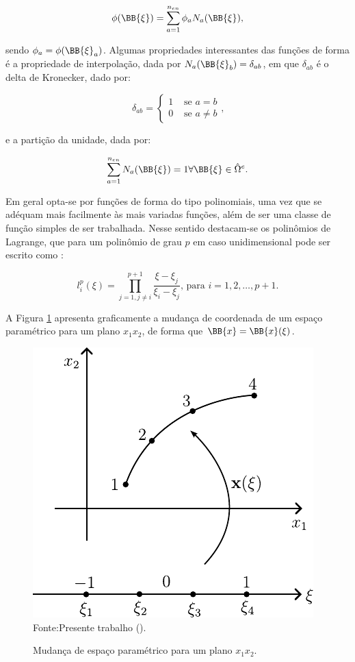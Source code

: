\begin{equation}
    \phi(\BB{\xi})=\sum_{a=1}^{n_{en}}{\phi_aN_a(\BB{\xi})}\text{,}
\end{equation}

\noindent sendo $\phi_a=\phi(\BB{\xi}_a)$. Algumas propriedades interessantes das funções de forma é a propriedade de interpolação, dada por $N_a(\BB{\xi}_b)=\delta_{ab}$, em que $\delta_{ab}$ é o delta de Kronecker, dado por:

\begin{equation}
    \delta_{ab}=\left\{
    \begin{array}{ll}
        1 & \text{ se }a=b     \\
        0 & \text{ se }a\neq b
    \end{array}
    \right.\text{,}
\end{equation}

\noindent e a partição da unidade, dada por:

\begin{equation}
    \sum_{a=1}^{n_{en}}{N_a(\BB{\xi})}=1\forall\BB{\xi}\in\hat{\Omega}^e\text{.}
\end{equation}

Em geral opta-se por funções de forma do tipo polinomiais, uma vez que se adéquam mais facilmente às mais variadas funções, além de ser uma classe de função simples de ser trabalhada. Nesse sentido destacam-se os polinômios de Lagrange, que para um polinômio de grau $p$ em caso unidimensional pode ser escrito como \cite{bazilevs2013computational}:

\begin{equation}
    l_i^p(\xi)=\prod_{j=1,j\neq i}^{p+1}{\frac{\xi-\xi_j}{\xi_i-\xi_j}}\text{, para }i=1,2,\hdots,p+1\text{.}
\end{equation}

A Figura \ref{fig:funcaoforma} apresenta graficamente a mudança de coordenada de um espaço paramétrico para um plano $x_1x_2$, de forma que $\BB{x}=\BB{x}(\xi)$.

\begin{figure}[h!]
    \centering
    \caption{Mudança de espaço paramétrico para um plano $x_1x_2$.}
    \includegraphics[width=.4\linewidth]{Figuras/funcaoforma.pdf}
    \\Fonte:Presente trabalho (\the\year).
    \label{fig:funcaoforma}
\end{figure}

